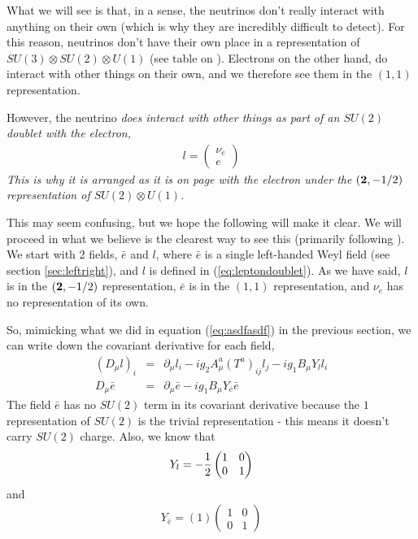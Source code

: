\documentclass[12pt,epsf]{article}
\begin{document}
What we will see is that, in a sense, the neutrinos don't really
interact with anything on their own (which is why they are incredibly
difficult to detect).  For this reason, neutrinos don't have their own
place in a representation of $SU(3)\otimes SU(2)\otimes U(1)$ (see
table on \pageref{standardmodelsummary}).  Electrons on the other hand,
do interact with other things on their own, and we therefore see them
in the $(1,1)$ representation.	

However, the neutrino \it does \rm interact with other things \it as
part of an \rm $SU(2)$ doublet \it with \rm the electron,
\begin{eqnarray}
l  = \begin{pmatrix} \nu_e \\ e \end{pmatrix} \label{eq:leptondoublet}
\end{eqnarray}
This is why it is arranged as it is on page \pageref{standardmodelsummary} with the electron
under the $(\bf 2\rm, -1/2)$ representation of $SU(2)\otimes U(1)$.  

This may seem confusing, but we hope the following will make it clear. 
We will proceed in what we believe is the clearest way to see this
(primarily following \cite{Srednicki}).  We start with 2 fields,
$\bar e$ and $l$, where $\bar e$ is a single left-handed Weyl field (see
section \ref{sec:leftright}), and $l$ is defined in
(\ref{eq:leptondoublet}).  As we have said, $l$ is in the $(\bf
2\rm,-1/2)$ representation, $\bar e$ is in the $(1,1)$ representation,
and $\nu_e$ has no representation of its own.  

So, mimicking what we did in equation (\ref{eq:asdfasdf}) in the
previous section, we can write down the covariant derivative for each
field,
\begin{eqnarray}
(D_{\mu}l)_i &=& \partial_{\mu}l_i - ig_2A^a_{\mu}(T^a)_{ij}l_j -
ig_1B_{\mu}Y_l l_i  \label{eq:mnbcvxnbmcvxbnmxcv}\\
D_{\mu}\bar e &=& \partial_{\mu}\bar e - ig_1 B_{\mu}Y_{\bar e} \bar e
\label{eq:uqyuiqweuiryqrewruyq}
\end{eqnarray}
The field $\bar e$ has no $SU(2)$ term in its covariant derivative
because the $1$ representation of $SU(2)$ is the trivial representation
- this means it doesn't carry $SU(2)$ charge.  Also, we know that
\begin{eqnarray}
Y_l = -{1\over 2} 
\begin{pmatrix}
1 & 0 \\ 0 & 1
\end{pmatrix} \label{eq:defyl}
\end{eqnarray}
and
\begin{eqnarray}
Y_{\bar e} = (1)
\begin{pmatrix}
1 & 0 \\ 0 & 1
\end{pmatrix} \label{eq:defye}
\end{eqnarray}
\end{document}
